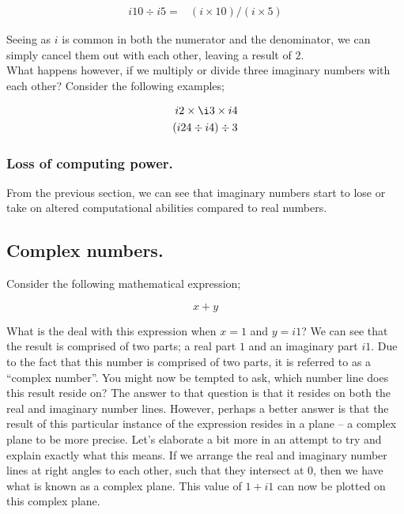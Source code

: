 \documentclass{article}
\begin{document}
\begin{align*}
i10 \div i5 =& (i \times 10) / (i \times 5)
\end{align*}

Seeing as $i$ is common in both the numerator and the denominator, we can simply cancel them out with each other,
leaving a result of $2$.\\

What happens however, if we multiply or divide three imaginary numbers with each other? Consider the following
examples;

\begin{align*}
i2 \times \i3 \times i4 \\
(i24 \div i4) \div 3 
\end{align*}


\subsubsection{Loss of computing power.}



From the previous section, we can see that imaginary numbers start to lose or take on altered computational
abilities compared to real numbers.


\subsection{Complex numbers.}

Consider the following mathematical expression;

\begin{equation*}
x + y
\end{equation*}

What is the deal with this expression when $x=1$ and $y=i1$? We can see that the result is comprised of two
parts; a real part $1$ and an imaginary part $i1$. Due to the fact that this number is comprised of two parts, it is
referred to as a ``complex number''. You might now be tempted to ask, which number line does this result reside on? The
answer to that question is that it resides on both the real and imaginary number lines. However, perhaps a better
answer is that
the result of this particular instance of the expression resides in a plane -- a complex plane to be more precise.
Let's elaborate a bit more in an attempt to try and explain exactly what this means. If we arrange the real and imaginary number
lines at right angles to each other, such that they intersect at 0, then we have what is known as a complex plane.
This value of $1 + i1$ can now be plotted on this complex plane.
\end{document}
